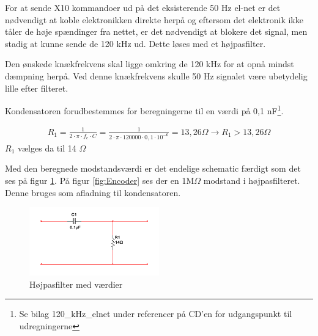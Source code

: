 For at sende X10 kommandoer ud på det eksisterende 50 Hz el-net er det nødvendigt at koble elektronikken direkte herpå og eftersom det elektronik ikke tåler de høje spændinger fra nettet, er det nødvendigt at blokere det signal, men stadig at kunne sende de 120 kHz ud. Dette løses med et højpasfilter.

Den ønskede knækfrekvens skal ligge omkring de 120 kHz for at opnå mindst dæmpning herpå. Ved denne knækfrekvens skulle 50 Hz signalet være ubetydelig lille efter filteret. 

Kondensatoren forudbestemmes for beregningerne til en værdi på 0,1 nF\footnote{Se bilag 120\_kHz\_elnet under referencer på CD'en for udgangspunkt til udregningerne}.

\begin{align}
R_1 = \frac{1}{2 \cdot \pi \cdot f_c \cdot C } = \frac{1}{2 \cdot \pi \cdot 120000 \cdot 0,1 \cdot 10^{-6}} = 13,26 \Omega
\rightarrow R_1 > 13,26 \Omega
\end{align}
$R_1$ vælges da til 14 $\Omega$

Med den beregnede modstandsværdi er det endelige schematic færdigt som det ses på figur \ref{fig:HP_MV}. På figur \ref{fig:Encoder} ses der en 1M$\Omega$ modstand i højpasfilteret. Denne bruges som afladning til kondensatoren.

\begin{figure}[htbp]
	\centering
	\includegraphics[width=0.50\textwidth]{billeder/HWdesign/HP_MV.png}
	\caption{Højpasfilter med værdier}
	\label{fig:HP_MV}
\end{figure}

\newpage
  
